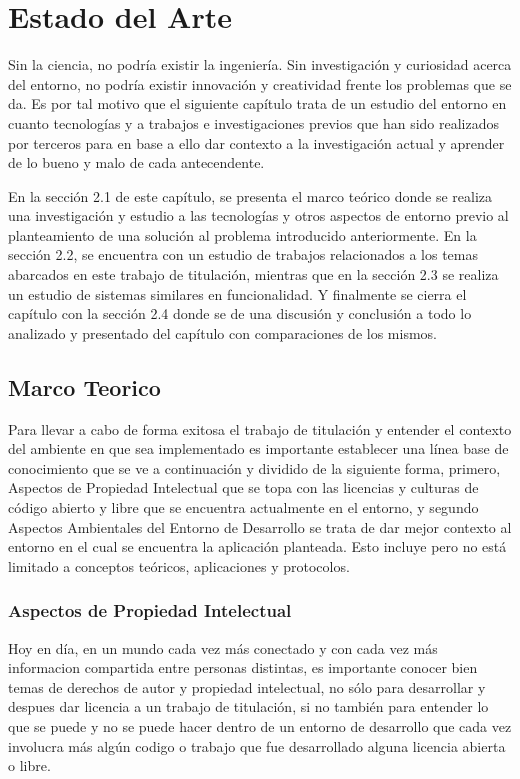 

\chapter{Estado del Arte}
\label{capitulo2}

Sin la ciencia, no podría existir la ingeniería. Sin investigación y curiosidad acerca del entorno, no podría existir innovación y creatividad frente los problemas que se da. Es por tal motivo que el siguiente capítulo trata de un estudio del entorno en cuanto tecnologías y a trabajos e investigaciones previos que han sido realizados por terceros para en base a ello dar contexto a la investigación actual y aprender de lo bueno y malo de cada antecendente.

En la sección 2.1 de este capítulo, se presenta el marco teórico donde se realiza una investigación y estudio a las tecnologías y otros aspectos de entorno previo al planteamiento de una solución al problema introducido anteriormente. En la sección 2.2, se encuentra con un estudio de trabajos relacionados a los temas abarcados en este trabajo de titulación, mientras que en la sección 2.3 se realiza un estudio de sistemas similares en funcionalidad. Y finalmente se cierra el capítulo con la sección 2.4 donde se de una discusión y conclusión a todo lo analizado y presentado del capítulo con comparaciones de los mismos. 

\section{Marco Teorico}
Para llevar a cabo de forma exitosa el trabajo de titulación y entender el contexto del ambiente en que sea implementado es importante establecer una línea base de conocimiento que se ve a continuación y dividido de la siguiente forma, primero, Aspectos de Propiedad Intelectual que se topa con las licencias y culturas de código abierto y libre que se encuentra actualmente en el entorno, y segundo Aspectos Ambientales del Entorno de Desarrollo se trata de dar mejor contexto al entorno en el cual se encuentra la aplicación planteada. Esto incluye pero no está limitado a conceptos teóricos, aplicaciones y protocolos.

\subsection{Aspectos de Propiedad Intelectual}
Hoy en día, en un mundo cada vez más conectado y con cada vez más informacion compartida entre personas distintas, es importante conocer bien temas de derechos de autor y propiedad intelectual, no sólo para desarrollar y despues dar licencia a un trabajo de titulación, si no también para entender lo que se puede y no se puede hacer dentro de un entorno de desarrollo que cada vez involucra más algún codigo o trabajo que fue desarrollado alguna licencia abierta o libre.

